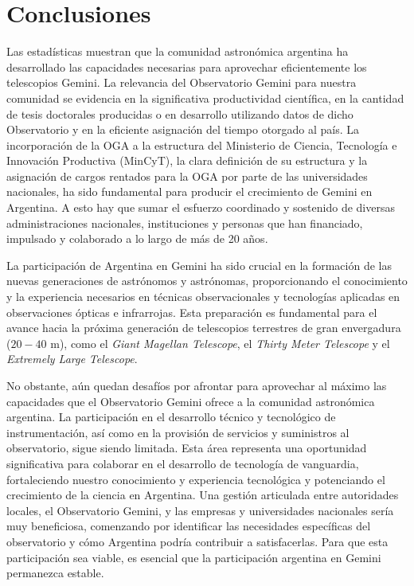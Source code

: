 \documentclass[baaa]{baaa}
\begin{document}
\section{Conclusiones}
Las estadísticas muestran que la comunidad astronómica argentina ha desarrollado las capacidades necesarias para aprovechar eficientemente los telescopios Gemini. La relevancia del Observatorio Gemini para nuestra comunidad se evidencia en la significativa productividad científica, en la cantidad de tesis doctorales producidas o en desarrollo utilizando datos de dicho Observatorio y en la eficiente asignación del tiempo otorgado al país. La incorporación de la OGA a la estructura del Ministerio de Ciencia, Tecnología e Innovación Productiva (MinCyT), la clara definición de su estructura y la asignación de cargos rentados para la OGA por parte de las universidades nacionales, ha sido fundamental para producir el crecimiento de Gemini en Argentina. A esto hay que sumar el esfuerzo coordinado y sostenido de diversas administraciones nacionales, instituciones y personas que han financiado, impulsado y colaborado a lo largo de más de 20 años.

La participación de Argentina en Gemini ha sido crucial en la formación de las nuevas generaciones de astrónomos y astrónomas, proporcionando el conocimiento y la experiencia necesarios en técnicas observacionales y tecnologías aplicadas en observaciones ópticas e infrarrojas. Esta preparación es fundamental para el avance hacia la próxima generación de telescopios terrestres de gran envergadura ($20 - 40$ m), como el {\em Giant Magellan Telescope}, el {\em Thirty Meter Telescope} y el {\em Extremely Large Telescope}.

No obstante, aún quedan desafíos por afrontar para aprovechar al máximo las capacidades que el Observatorio Gemini ofrece a la comunidad astronómica argentina. La participación en el desarrollo técnico y tecnológico de instrumentación, así como en la provisión de servicios y suministros al observatorio, sigue siendo limitada. Esta área representa una oportunidad significativa para colaborar en el desarrollo de tecnología de vanguardia, fortaleciendo nuestro conocimiento y experiencia tecnológica y potenciando el crecimiento de la ciencia en Argentina. Una gestión articulada entre autoridades locales, el Observatorio Gemini, y las empresas y universidades nacionales sería muy beneficiosa, comenzando por identificar las necesidades específicas del observatorio y cómo Argentina podría contribuir a satisfacerlas. 
Para que esta participación sea viable, es esencial que la participación argentina en Gemini permanezca estable.
\end{document}
